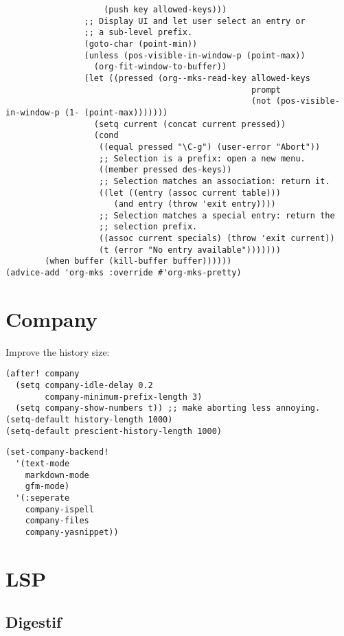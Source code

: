 \documentclass[c]{article}
\theoremstyle{plain}%
\theoremstyle{definition}
\theoremstyle{remark}
\begin{document}
\begin{verbatim}
                    (push key allowed-keys)))
                ;; Display UI and let user select an entry or
                ;; a sub-level prefix.
                (goto-char (point-min))
                (unless (pos-visible-in-window-p (point-max))
                  (org-fit-window-to-buffer))
                (let ((pressed (org--mks-read-key allowed-keys
                                                  prompt
                                                  (not (pos-visible-in-window-p (1- (point-max)))))))
                  (setq current (concat current pressed))
                  (cond
                   ((equal pressed "\C-g") (user-error "Abort"))
                   ;; Selection is a prefix: open a new menu.
                   ((member pressed des-keys))
                   ;; Selection matches an association: return it.
                   ((let ((entry (assoc current table)))
                      (and entry (throw 'exit entry))))
                   ;; Selection matches a special entry: return the
                   ;; selection prefix.
                   ((assoc current specials) (throw 'exit current))
                   (t (error "No entry available")))))))
        (when buffer (kill-buffer buffer))))))
(advice-add 'org-mks :override #'org-mks-pretty)
\end{verbatim}
\section{Company}
\label{sec:org7c25b7f}
Improve the history size:
\begin{verbatim}
(after! company
  (setq company-idle-delay 0.2
        company-minimum-prefix-length 3)
  (setq company-show-numbers t)) ;; make aborting less annoying.
(setq-default history-length 1000)
(setq-default prescient-history-length 1000)
\end{verbatim}
\begin{verbatim}
(set-company-backend!
  '(text-mode
    markdown-mode
    gfm-mode)
  '(:seperate
    company-ispell
    company-files
    company-yasnippet))
\end{verbatim}
\section{LSP}
\label{sec:orgfec98af}
\subsection{Digestif}
\label{sec:orgdab9a36}
\end{document}
